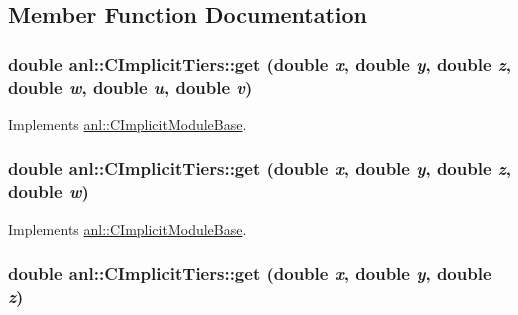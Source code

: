 \subsection{Member Function Documentation}
\hypertarget{classanl_1_1CImplicitTiers_a0b150115944a998eac7c87ea937c1f89}{
\subsubsection[{get}]{\setlength{\rightskip}{0pt plus 5cm}double anl::CImplicitTiers::get (double {\em x}, \/  double {\em y}, \/  double {\em z}, \/  double {\em w}, \/  double {\em u}, \/  double {\em v})}}
\label{classanl_1_1CImplicitTiers_a0b150115944a998eac7c87ea937c1f89}


Implements \hyperlink{classanl_1_1CImplicitModuleBase_aa40b7d54572197612a4fea44b63447eb}{anl::CImplicitModuleBase}.\hypertarget{classanl_1_1CImplicitTiers_a7bb007d1a541d37b5d48027a932f4117}{
\subsubsection[{get}]{\setlength{\rightskip}{0pt plus 5cm}double anl::CImplicitTiers::get (double {\em x}, \/  double {\em y}, \/  double {\em z}, \/  double {\em w})}}
\label{classanl_1_1CImplicitTiers_a7bb007d1a541d37b5d48027a932f4117}


Implements \hyperlink{classanl_1_1CImplicitModuleBase_a3cf520bdab59631864253c03b4e1723f}{anl::CImplicitModuleBase}.\hypertarget{classanl_1_1CImplicitTiers_a6b1cc8151e56b6c9c66da13be3f73a80}{
\subsubsection[{get}]{\setlength{\rightskip}{0pt plus 5cm}double anl::CImplicitTiers::get (double {\em x}, \/  double {\em y}, \/  double {\em z})}}
\label{classanl_1_1CImplicitTiers_a6b1cc8151e56b6c9c66da13be3f73a80}


